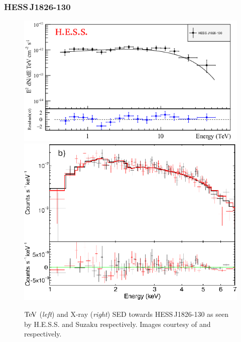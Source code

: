 \subsubsection{HESS\,J1826-130}
\begin{figure}[b!]
	\centering
	\includegraphics[height=0.18\textheight]{04_Introduction/Images/pulsar_wind_nebula/1826_energy_flux.png}
    \includegraphics[height=0.18\textheight]{04_Introduction/Images/pulsar_wind_nebula/hess_j1826_130_xray.eps}
	\caption{$\TeV$ (\textit{left}) and X-ray (\textit{right}) SED towards \mbox{HESS\,J1826-130} as seen by H.E.S.S. and Suzaku respectively. Images courtesy of \cite{2020A&A...644A.112H} and \cite{2019A&A...623A.115D} respectively.}
	\label{fig:chapter1_hess_j1826_SED}
\end{figure}


